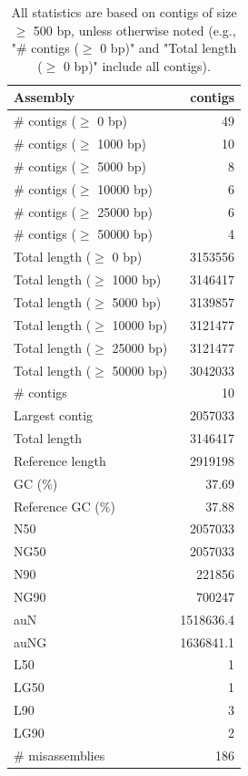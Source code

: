 \documentclass[12pt,a4paper]{article}
\begin{document}
\begin{table}[ht]
\begin{center}
\caption{All statistics are based on contigs of size $\geq$ 500 bp, unless otherwise noted (e.g., "\# contigs ($\geq$ 0 bp)" and "Total length ($\geq$ 0 bp)" include all contigs).}
\begin{tabular}{|l*{1}{|r}|}
\hline
Assembly & contigs \\ \hline
\# contigs ($\geq$ 0 bp) & 49 \\ \hline
\# contigs ($\geq$ 1000 bp) & 10 \\ \hline
\# contigs ($\geq$ 5000 bp) & 8 \\ \hline
\# contigs ($\geq$ 10000 bp) & 6 \\ \hline
\# contigs ($\geq$ 25000 bp) & 6 \\ \hline
\# contigs ($\geq$ 50000 bp) & 4 \\ \hline
Total length ($\geq$ 0 bp) & 3153556 \\ \hline
Total length ($\geq$ 1000 bp) & 3146417 \\ \hline
Total length ($\geq$ 5000 bp) & 3139857 \\ \hline
Total length ($\geq$ 10000 bp) & 3121477 \\ \hline
Total length ($\geq$ 25000 bp) & 3121477 \\ \hline
Total length ($\geq$ 50000 bp) & 3042033 \\ \hline
\# contigs & 10 \\ \hline
Largest contig & 2057033 \\ \hline
Total length & 3146417 \\ \hline
Reference length & 2919198 \\ \hline
GC (\%) & 37.69 \\ \hline
Reference GC (\%) & 37.88 \\ \hline
N50 & 2057033 \\ \hline
NG50 & 2057033 \\ \hline
N90 & 221856 \\ \hline
NG90 & 700247 \\ \hline
auN & 1518636.4 \\ \hline
auNG & 1636841.1 \\ \hline
L50 & 1 \\ \hline
LG50 & 1 \\ \hline
L90 & 3 \\ \hline
LG90 & 2 \\ \hline
\# misassemblies & 186 \\ \hline

\end{tabular}
\end{center}
\end{table}
\end{document}
